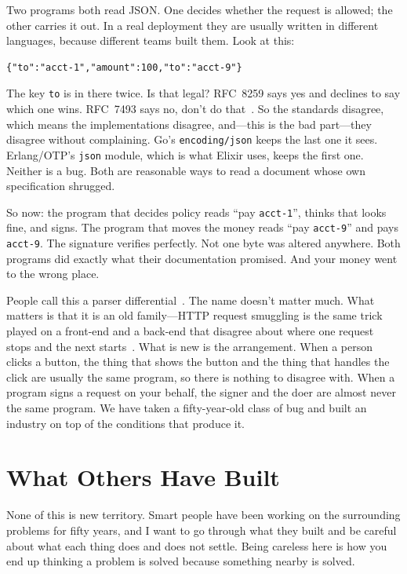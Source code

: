 \documentclass[11pt]{article}
\begin{document}
Two programs both read JSON. One decides whether the request is allowed; the
other carries it out. In a real deployment they are usually written in
different languages, because different teams built them. Look at this:

\begin{lstlisting}
{"to":"acct-1","amount":100,"to":"acct-9"}
\end{lstlisting}

The key \texttt{to} is in there twice. Is that legal? RFC~8259 says yes and
declines to say which one wins. RFC~7493 says no, don't do
that~\cite{rfc8259,rfc7493}. So the standards disagree, which means the
implementations disagree, and---this is the bad part---they disagree without
complaining. Go's \texttt{encoding/json} keeps the last one it sees.
Erlang/OTP's \texttt{json} module, which is what Elixir uses, keeps the first
one. Neither is a bug. Both are reasonable ways to read a document whose own
specification shrugged.

So now: the program that decides policy reads ``pay \texttt{acct-1}'', thinks
that looks fine, and signs. The program that moves the money reads ``pay
\texttt{acct-9}'' and pays \texttt{acct-9}. The signature verifies perfectly.
Not one byte was altered anywhere. Both programs did exactly what their
documentation promised. And your money went to the wrong place.

People call this a parser differential~\cite{kaminsky2010}. The name doesn't
matter much. What matters is that it is an old family---HTTP request smuggling
is the same trick played on a front-end and a back-end that disagree about
where one request stops and the next starts~\cite{linhart2005,kettle2019}. What
is new is the arrangement. When a person clicks a button, the thing that shows
the button and the thing that handles the click are usually the same program,
so there is nothing to disagree with. When a program signs a request on your
behalf, the signer and the doer are almost never the same program. We have
taken a fifty-year-old class of bug and built an industry on top of the
conditions that produce it.

\section{What Others Have Built}
\label{sec:related}

None of this is new territory. Smart people have been working on the
surrounding problems for fifty years, and I want to go through what they built
and be careful about what each thing does and does not settle. Being careless
here is how you end up thinking a problem is solved because something nearby
is solved.
\end{document}
